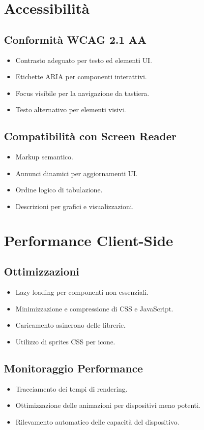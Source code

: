 \section{Accessibilità}

\subsection{Conformità WCAG 2.1 AA}
\begin{itemize}
    \item Contrasto adeguato per testo ed elementi UI.
    \item Etichette ARIA per componenti interattivi.
    \item Focus visibile per la navigazione da tastiera.
    \item Testo alternativo per elementi visivi.
\end{itemize}

\subsection{Compatibilità con Screen Reader}
\begin{itemize}
    \item Markup semantico.
    \item Annunci dinamici per aggiornamenti UI.
    \item Ordine logico di tabulazione.
    \item Descrizioni per grafici e visualizzazioni.
\end{itemize}

\section{Performance Client-Side}

\subsection{Ottimizzazioni}
\begin{itemize}
    \item Lazy loading per componenti non essenziali.
    \item Minimizzazione e compressione di CSS e JavaScript.
    \item Caricamento asincrono delle librerie.
    \item Utilizzo di sprites CSS per icone.
\end{itemize}

\subsection{Monitoraggio Performance}
\begin{itemize}
    \item Tracciamento dei tempi di rendering.
    \item Ottimizzazione delle animazioni per dispositivi meno potenti.
    \item Rilevamento automatico delle capacità del dispositivo.
\end{itemize}

